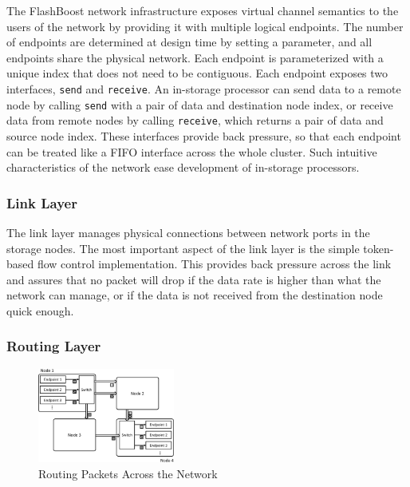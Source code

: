 The FlashBoost network infrastructure exposes virtual channel semantics to the
users of the network by providing it with multiple logical endpoints.  The
number of endpoints are determined at design time by setting a parameter, and
all endpoints share the physical network.  Each endpoint is parameterized with a
unique index that does not need to be contiguous.  Each endpoint exposes two
interfaces, \texttt{send} and \texttt{receive}. An in-storage processor can send
data to a remote node by calling \texttt{send} with a pair of data and
destination node index, or receive data from remote nodes by calling
\texttt{receive}, which returns a pair of data and source node index. These
interfaces provide back pressure, so that each endpoint can be treated like a
FIFO interface across the whole cluster. Such intuitive characteristics of the
network ease development of in-storage processors.

\subsubsection{Link Layer}

The link layer manages physical connections between network ports in the storage
nodes. The most important aspect of the link layer is the simple token-based
flow control implementation. This provides back pressure across the link and
assures that no packet will drop if the data rate is higher than what the
network can manage, or if the data is not received from the destination node
quick enough.

\subsubsection{Routing Layer}


\begin{figure}[h]
	\begin{center}
	\includegraphics[width=0.4\textwidth]{figures/routing-crop.pdf}
	\caption{Routing Packets Across the Network}
	\label{fig:networkrouting}
	\end{center}
\end{figure}

